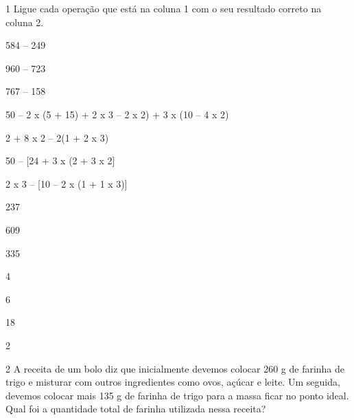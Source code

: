 
\num{1} Ligue cada operação que está na coluna 1 com o seu resultado correto na coluna 2.

\begin{multicols}{2}
584 -- 249 

960 -- 723 

767 -- 158 

50 -- 2 x (5 + 15) + 2 x 3 -- 2 x 2) + 3 x (10 -- 4 x 2) 

2 + 8 x 2 -- 2(1 + 2 x 3) 

50 -- {[}24 + 3 x (2 + 3 x 2{]} 

2 x 3 -- {[}10 -- 2 x (1 + 1 x 3){]} 

\columnbreak


237

609

335

4

6

18

2
\end{multicols}




\num{2} A receita de um bolo diz que inicialmente devemos colocar 260 g de
farinha de trigo e misturar com outros ingredientes como ovos, açúcar e
leite. Um seguida, devemos colocar mais 135 g de farinha de trigo para a
massa ficar no ponto ideal. Qual foi a quantidade total de farinha
utilizada nessa receita?


